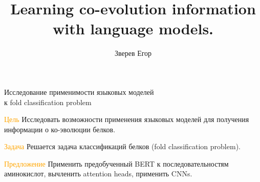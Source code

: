 \documentclass{beamer}
\title[\hbox to 56mm{Learning co-evolution information}]{Learning co-evolution information \\ with language models.}
\author[Е.\,О. Зверев]{Зверев Егор}
\institute{Московский физико-технический институт}
\date{\footnotesize
\par\smallskip\emph{Курс:} Автоматизация научных исследований\par (практика, В.\,В.~Стрижов)/Группа 821
\par\smallskip\emph{Эксперт:} Сергей Грудинин
\par\smallskip\emph{Консультант:} Илья Игашов
\par\bigskip\small 2021}
\begin{document}
\begin{frame}
\thispagestyle{empty}
\maketitle
\end{frame}
\begin{frame}{Исследование применимости языковых моделей \\к fold classification problem}
\begin{block}{\textcolor{orange}{Цель}}
Исследовать возможности применения языковых моделей для получения информации о ко-эволюции белков.
\end{block}
\begin{block} {\textcolor{orange}{Задача}}
Решается задача классификаций белков (fold classification problem).
\end{block}
\begin{block} {\textcolor{orange}{Предложение}}
Применить предобученный BERT к последовательностям аминокислот, вычленить attention heads, применить CNNs.
\end{block}

\end{frame}
\end{document}
